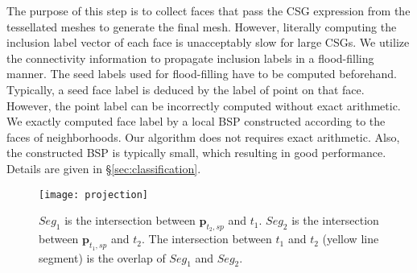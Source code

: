 
The purpose of this step is to collect faces that pass the CSG expression from the tessellated meshes to generate the final mesh. However, literally computing the inclusion label vector of each face is unacceptably slow for large CSGs. We utilize the connectivity information to propagate inclusion labels in a flood-filling manner. The seed labels used for flood-filling have to be computed beforehand. Typically, a seed face label is deduced by the label of point on that face. However, the point label can be incorrectly computed without exact arithmetic. We exactly computed face label by a local BSP constructed according to the faces of neighborhoods. Our algorithm does not requires exact arithmetic. Also, the constructed BSP is typically small, which resulting in good performance. Details are given in \S\ref{sec:classification}.


\begin{figure}[t]
\centering
\texttt{[image: projection]}
\caption{$Seg_1$ is the intersection between $\bm{p}_{t_2, sp}$ and $t_1$. $Seg_2$ is the intersection between $\bm{p}_{t_1, sp}$ and $t_2$. The intersection between $t_1$ and $t_2$ (yellow line segment) is the overlap of $Seg_1$ and $Seg_2$.}
\label{fig_projection}
\end{figure}
